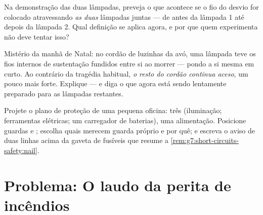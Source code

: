 \begin{exercise}[$\star\star$]\label{exo:g7:short-circuits-safety:10}
Na demonstração das duas lâmpadas, preveja o que acontece se o fio do
desvio for colocado atravessando \emph{as duas} lâmpadas juntas ---
de antes da lâmpada 1 até depois da lâmpada 2. Qual definição se
aplica agora, e por que quem experimenta não deve tentar isso?
\end{exercise}

\begin{exercise}[$\star\star$]\label{exo:g7:short-circuits-safety:11}
Mistério da manhã de Natal: no cordão de luzinhas  da avó,
uma lâmpada teve os fios internos de sustentação fundidos entre si ao
morrer --- pondo a si mesma em curto. Ao contrário da tragédia
habitual, \emph{o resto do cordão continua aceso}, um pouco mais
forte. Explique --- e diga o que agora está sendo lentamente
preparado para as lâmpadas restantes.
\end{exercise}

\begin{exercise}[$\star\star\star$]\label{exo:g7:short-circuits-safety:12}
Projete o plano de proteção de uma pequena oficina: três   (iluminação; ferramentas elétricas; um carregador de
baterias), uma alimentação. Posicione guardas e ;
escolha quais  merecem guarda próprio e por quê; e escreva o
aviso de duas linhas acima da gaveta de fusíveis que resume a
\cref{rem:g7:short-circuits-safety:nail}.
\end{exercise}

\section{Problema: O laudo da perita de incêndios}

